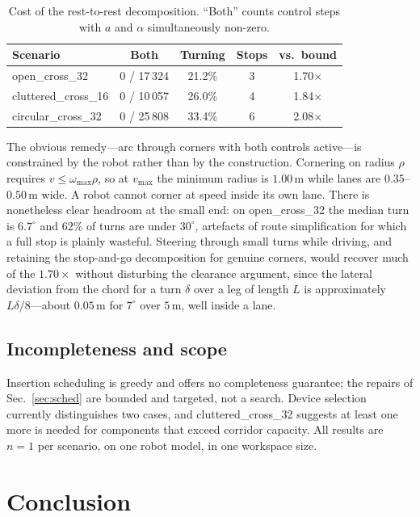 \documentclass[conference]{IEEEtran}
\begin{document}
\begin{table}[t]
\caption{Cost of the rest-to-rest decomposition. ``Both'' counts control steps with $a$ and
$\alpha$ simultaneously non-zero.}
\label{tab:control}
\centering
\small
\begin{tabular}{@{}lcccc@{}}
\toprule
Scenario & Both & Turning & Stops & vs.\ bound \\
\midrule
open\_cross\_32      & 0 / 17\,324 & 21.2\% & 3 & 1.70$\times$ \\
cluttered\_cross\_16 & 0 / 10\,057 & 26.0\% & 4 & 1.84$\times$ \\
circular\_cross\_32  & 0 / 25\,808 & 33.4\% & 6 & 2.08$\times$ \\
\bottomrule
\end{tabular}
\end{table}

The obvious remedy---arc through corners with both controls active---is constrained by the
robot rather than by the construction. Cornering on radius $\rho$ requires
$v \le \omega_{\max}\rho$, so at $v_{\max}$ the minimum radius is $1.00$\,m while lanes are
$0.35$--$0.50$\,m wide. A robot cannot corner at speed inside its own lane. There is
nonetheless clear headroom at the small end: on open\_cross\_32 the median turn is
$6.7^\circ$ and 62\% of turns are under $30^\circ$, artefacts of route simplification for
which a full stop is plainly wasteful. Steering through small turns while driving, and
retaining the stop-and-go decomposition for genuine corners, would recover much of the
$1.70\times$ without disturbing the clearance argument, since the lateral deviation from
the chord for a turn $\delta$ over a leg of length $L$ is approximately $L\delta/8$---about
$0.05$\,m for $7^\circ$ over $5$\,m, well inside a lane.

\subsection{Incompleteness and scope}
Insertion scheduling is greedy and offers no completeness guarantee; the repairs of
Sec.~\ref{sec:sched} are bounded and targeted, not a search. Device selection currently
distinguishes two cases, and cluttered\_cross\_32 suggests at least one more is needed for
components that exceed corridor capacity. All results are $n = 1$ per scenario, on one robot
model, in one workspace size.

\section{Conclusion}
\end{document}
